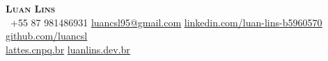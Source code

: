 \begin{center}
    \textbf{\Huge \scshape Luan Lins} \\ \vspace{5pt}
     \ \small +55 87 981486931 \quad
    \href{mailto:luancsl95@gmail.com}{ \underline{luancsl95@gmail.com}} \quad
    \href{https://www.linkedin.com/in/luan-lins-b5960570}{ \underline{linkedin.com/luan-lins-b5960570}} \quad
    \href{https://github.com/}{ \underline{github.com/luancsl}} \quad \\ \vspace{10pt} 
    \href{http://lattes.cnpq.br/9321874150400095}{ \underline{lattes.cnpq.br}} \quad
    \href{https://luanlins.dev.br}{ \underline{luanlins.dev.br}}
\end{center}